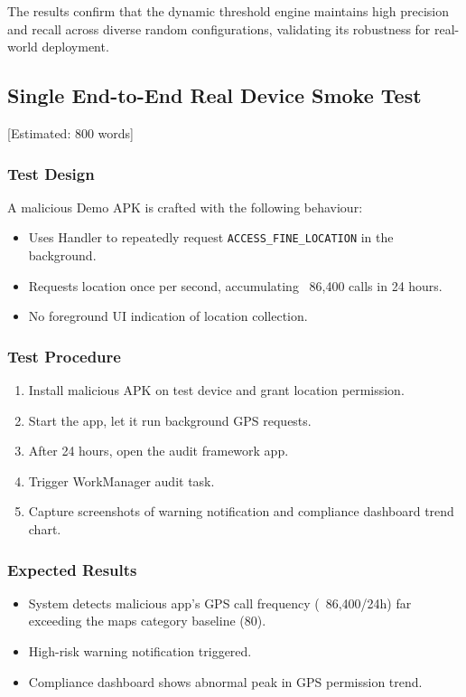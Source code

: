 The results confirm that the dynamic threshold engine maintains high precision and recall across diverse random configurations, validating its robustness for real-world deployment.

\subsection{Single End-to-End Real Device Smoke Test} [Estimated: 800 words]

\subsubsection{Test Design}
A malicious Demo APK is crafted with the following behaviour:
\begin{itemize}
\item Uses Handler to repeatedly request \texttt{ACCESS\_FINE\_LOCATION} in the background.
\item Requests location once per second, accumulating ~86,400 calls in 24 hours.
\item No foreground UI indication of location collection.
\end{itemize}

\subsubsection{Test Procedure}
\begin{enumerate}
\item Install malicious APK on test device and grant location permission.
\item Start the app, let it run background GPS requests.
\item After 24 hours, open the audit framework app.
\item Trigger WorkManager audit task.
\item Capture screenshots of warning notification and compliance dashboard trend chart.
\end{enumerate}

\subsubsection{Expected Results}
\begin{itemize}
\item System detects malicious app's GPS call frequency (~86,400/24h) far exceeding the maps category baseline (80).
\item High-risk warning notification triggered.
\item Compliance dashboard shows abnormal peak in GPS permission trend.
\end{itemize}


